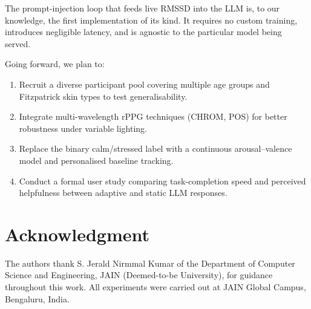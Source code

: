 \documentclass[conference]{IEEEtran}
\begin{document}
The prompt-injection loop that feeds live RMSSD into the LLM is,
to our knowledge, the first implementation of its kind. It
requires no custom training, introduces negligible latency, and
is agnostic to the particular model being served.

Going forward, we plan to:

\begin{enumerate}
  \item Recruit a diverse participant pool covering multiple age
        groups and Fitzpatrick skin types to test generalisability.
  \item Integrate multi-wavelength rPPG techniques (CHROM, POS)
        for better robustness under variable lighting.
  \item Replace the binary calm/stressed label with a continuous
        arousal--valence model and personalised baseline tracking.
  \item Conduct a formal user study comparing task-completion speed
        and perceived helpfulness between adaptive and static LLM
        responses.
\end{enumerate}


\section*{Acknowledgment}

The authors thank S. Jerald Nirmmal Kumar of the Department of
Computer Science and Engineering, JAIN (Deemed-to-be University),
for guidance throughout this work. All experiments were carried out
at JAIN Global Campus, Bengaluru, India.




\end{document}
